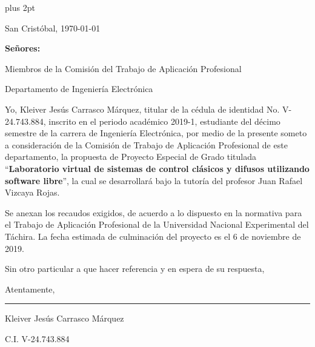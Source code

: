 \begin{titlepage}
\parskip=7.25pt plus 2pt
\setcounter{page}{2}
\begin{flushright}
	San Cristóbal, \today
\end{flushright}

\vspace{1cm}
\vfill

\begin{flushleft}
		\singlespacing
		\setlength{\parskip}{0pt}
		
		\textbf{Señores:}
		
		Miembros de la Comisión del Trabajo de Aplicación Profesional
		
		Departamento de Ingeniería Electrónica
		
\end{flushleft}

\vfill
\begin{spacing}{1.5}
	Yo, Kleiver Jesús Carrasco Márquez, titular de la cédula de identidad No. \mbox{V-24.743.884}, inscrito en el periodo académico 2019-1, estudiante del décimo semestre de la carrera de Ingeniería Electrónica, por medio de la presente someto a consideración de la Comisión de Trabajo de Aplicación Profesional de este departamento, la propuesta de Proyecto Especial de Grado titulada \enquote{\textbf{Laboratorio virtual de sistemas de control clásicos y difusos utilizando software libre}}, la cual se desarrollará bajo la tutoría del profesor Juan Rafael Vizcaya Rojas.
	
	Se anexan los recaudos exigidos, de acuerdo a lo dispuesto en la normativa para el Trabajo de Aplicación Profesional de la Universidad Nacional Experimental del Táchira. La fecha estimada de culminación del proyecto es el 6 de noviembre de 2019.
	
	Sin otro particular a que hacer referencia y en espera de su respuesta,
	
	\setlength{\parskip}{20pt} 
	
	\noindent Atentamente,
\end{spacing}

\vfill

\begin{center}
	
	\rule{6cm}{1pt}
	
	\vspace{0.2cm}
	
	Kleiver Jesús Carrasco Márquez
	
	\setlength{\parskip}{0pt}
	
	C.I. V-24.743.884
\end{center}

\vspace{0.5cm}
\end{titlepage}